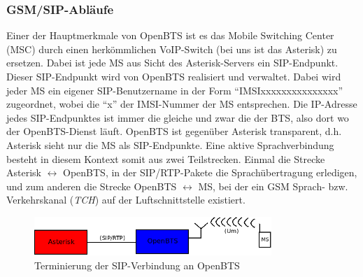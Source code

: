 \subsubsection{GSM/SIP-Abläufe}
\label{gsmsip} 
Einer der Hauptmerkmale von OpenBTS ist es das Mobile Switching Center (MSC) durch einen herkömmlichen VoIP-Switch (bei uns ist das Asterisk) zu ersetzen. Dabei ist jede MS aus Sicht des Asterisk-Servers ein SIP-Endpunkt. Dieser SIP-Endpunkt wird von OpenBTS realisiert und verwaltet. Dabei wird jeder MS ein eigener SIP-Benutzername in der Form "`IMSIxxxxxxxxxxxxxxx"' zugeordnet, wobei die "`x"' der IMSI-Nummer der MS entsprechen. Die IP-Adresse jedes SIP-Endpunktes ist immer die gleiche und zwar die der BTS, also dort wo der OpenBTS-Dienst läuft. OpenBTS ist gegenüber Asterisk transparent, d.h. Asterisk sieht nur die MS als SIP-Endpunkte. Eine aktive Sprachverbindung besteht in diesem Kontext somit aus zwei Teilstrecken. Einmal die Strecke Asterisk $ \longleftrightarrow $ OpenBTS, in der SIP/RTP-Pakete die Sprachübertragung erledigen, und zum anderen die Strecke OpenBTS $ \longleftrightarrow $ MS, bei der ein GSM Sprach- bzw. Verkehrskanal (\textit{TCH}) auf der Luftschnittstelle existiert. 
\begin{figure}[h]
	\centering
		\includegraphics[width=0.80\textwidth]{img/openbts_sip_asterisk.png}
	\caption{Terminierung der SIP-Verbindung an OpenBTS}
	\label{fig:openbts_sip_asterisk}
\end{figure}

